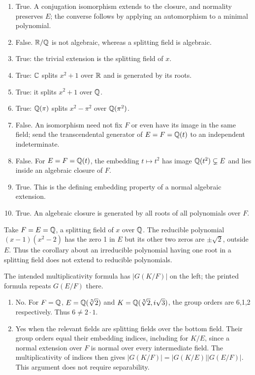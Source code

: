 \begin{enumerate}[label=(\alph*)]
\item True. A conjugation isomorphism extends to the closure, and normality preserves $E$; the converse follows by applying an automorphism to a minimal polynomial.
\item False. $\mathbb{R}/\mathbb{Q}$ is not algebraic, whereas a splitting field is algebraic.
\item True: the trivial extension is the splitting field of $x$.
\item True: $\mathbb{C}$ splits $x^2+1$ over $\mathbb{R}$ and is generated by its roots.
\item True: it splits $x^2+1$ over $\mathbb{Q}$.
\item True: $\mathbb{Q}(\pi)$ splits $x^2-\pi^2$ over $\mathbb{Q}(\pi^2)$.
\item False. An isomorphism need not fix $F$ or even have its image in the same field; send the transcendental generator of $E=F=\mathbb{Q}(t)$ to an independent indeterminate.
\item False. For $E=F=\mathbb{Q}(t)$, the embedding $t\mapsto t^2$ has image $\mathbb{Q}(t^2)\subsetneq E$ and lies inside an algebraic closure of $F$.
\item True. This is the defining embedding property of a normal algebraic extension.
\item True. An algebraic closure is generated by all roots of all polynomials over $F$.
\end{enumerate}

Take $F=E=\mathbb{Q}$, a splitting field of $x$ over $\mathbb{Q}$. The reducible polynomial $(x-1)(x^2-2)$ has the zero 1 in $E$ but its other two zeros are $\pm\sqrt2$, outside $E$. Thus the corollary about an irreducible polynomial having one root in a splitting field does not extend to reducible polynomials.

The intended multiplicativity formula has $|G(K/F)|$ on the left; the printed formula repeats $G(E/F)$ there.
\begin{enumerate}[label=(\alph*)]
\item No. For $F=\mathbb{Q}$, $E=\mathbb{Q}(\sqrt[3]2)$ and $K=\mathbb{Q}(\sqrt[3]2,i\sqrt3)$, the group orders are 6,1,2 respectively. Thus $6\ne2\cdot1$.
\item Yes when the relevant fields are splitting fields over the bottom field. Their group orders equal their embedding indices, including for $K/E$, since a normal extension over $F$ is normal over every intermediate field. The multiplicativity of indices then gives $|G(K/F)|=|G(K/E)||G(E/F)|$. This argument does not require separability.
\end{enumerate}

